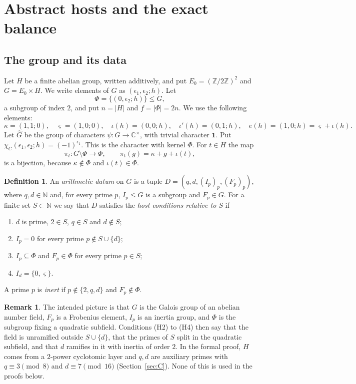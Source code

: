 \documentclass[11pt]{amsart}
\newcommand{\CC}{\mathbb{C}}
\newcommand{\Z}{\mathbb{Z}}
\newcommand{\N}{\mathbb{N}}
\newcommand{\Gh}{\widehat{G}}
\newcommand{\pa}{\pi}
\theoremstyle{plain}
\theoremstyle{definition}
\newtheorem{definition}[theorem]{Definition}
\newtheorem{remark}[theorem]{Remark}
\numberwithin{equation}{section}
\begin{document}
\section{Abstract hosts and the exact balance}\label{sec:hosts}

\subsection{The group and its data}

Let $H$ be a finite abelian group, written additively, and put $E_0=(\Z/2\Z)^2$ and
$G=E_0\times H$. We write elements of $G$ as $(\epsilon_1,\epsilon_2;h)$. Let
\[
\Phi=\{(0,\epsilon_2;h)\}\le G,
\]
a subgroup of index $2$, and put $n=|H|$ and $f=|\Phi|=2n$. We use the following elements:
\[
\kappa=(1,1;0),\quad \varsigma=(1,0;0),\quad \iota(h)=(0,0;h),\quad \iota'(h)=(0,1;h),\quad e(h)=(1,0;h)=\varsigma+\iota(h).
\]
Let $\Gh$ be the group of characters $\psi:G\to\CC^\times$, with trivial character $\mathbf 1$. Put
$\chi_C(\epsilon_1,\epsilon_2;h)=(-1)^{\epsilon_1}$. This is the character with kernel $\Phi$.
For $t\in H$ the map
\[
\pa_t:G\setminus\Phi\to\Phi,\qquad \pa_t(g)=\kappa+g+\iota(t),
\]
is a bijection, because $\kappa\notin\Phi$ and $\iota(t)\in\Phi$.

\begin{definition}\label{def:datum}
An \emph{arithmetic datum} on $G$ is a tuple $D=(q,d,(I_p)_p,(F_p)_p)$, where $q,d\in\N$ and, for
every prime $p$, $I_p\le G$ is a subgroup and $F_p\in G$. For a finite set $S\subset\N$ we say that
$D$ satisfies the \emph{host conditions relative to $S$} if
\begin{enumerate}[label=\textup{(H\arabic*)}]
\item $d$ is prime, $2\in S$, $q\in S$ and $d\notin S$;
\item $I_p=0$ for every prime $p\notin S\cup\{d\}$;
\item $I_p\subseteq\Phi$ and $F_p\in\Phi$ for every prime $p\in S$;
\item $I_d=\{0,\varsigma\}$.
\end{enumerate}
A prime $p$ is \emph{inert} if $p\notin\{2,q,d\}$ and $F_p\notin\Phi$.
\end{definition}

\begin{remark}\label{rem:interpretation}
The intended picture is that $G$ is the Galois group of an abelian number field, $F_p$ is a
Frobenius element, $I_p$ is an inertia group, and $\Phi$ is the subgroup fixing a quadratic
subfield. Conditions (H2) to (H4) then say that the field is unramified outside $S\cup\{d\}$, that
the primes of $S$ split in the quadratic subfield, and that $d$ ramifies in it with inertia of
order $2$. In the formal proof, $H$ comes from a $2$-power cyclotomic layer and $q,d$ are auxiliary
primes with $q\equiv3\pmod 8$ and $d\equiv7\pmod{16}$ (Section~\ref{sec:C}). None of this is used in
the proofs below.
\end{remark}
\end{document}
